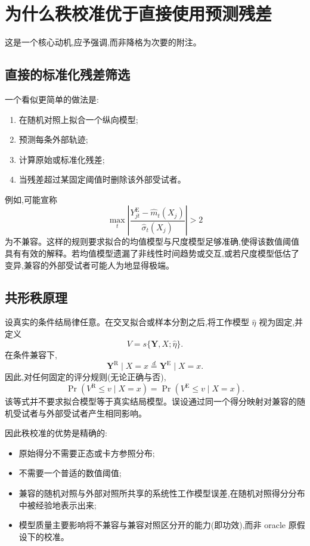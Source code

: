 \documentclass[11pt]{article}
\newcommand{\R}{\mathrm{R}}
\newcommand{\E}{\mathrm{E}}
\begin{document}
\section{为什么秩校准优于直接使用预测残差}

这是一个核心动机,应予强调,而非降格为次要的附注。

\subsection{直接的标准化残差筛选}

一个看似更简单的做法是:
\begin{enumerate}
    \item 在随机对照上拟合一个纵向模型;
    \item 预测每条外部轨迹;
    \item 计算原始或标准化残差;
    \item 当残差超过某固定阈值时删除该外部受试者。
\end{enumerate}

例如,可能宣称
\[
\max_t\left|
\frac{Y_{jt}^{\E}-\widehat m_t(X_j)}{\widehat\sigma_t(X_j)}
\right|>2
\]
为不兼容。这样的规则要求拟合的均值模型与尺度模型足够准确,使得该数值阈值具有有效的解释。若均值模型遗漏了非线性时间趋势或交互,或若尺度模型低估了变异,兼容的外部受试者可能人为地显得极端。

\subsection{共形秩原理}

设真实的条件结局律任意。在交叉拟合或样本分割之后,将工作模型 $\widehat\eta$ 视为固定,并定义
\[
V=s\{\bm Y,X;\widehat\eta\}.
\]
在条件兼容下,
\[
\bm Y^{\R}\mid X=x
\overset d=
\bm Y^{\E}\mid X=x.
\]
因此,对任何固定的评分规则(无论正确与否),
\[
\Pr(V^{\R}\le v\mid X=x)
=
\Pr(V^{\E}\le v\mid X=x).
\tag{2}
\]
该等式并不要求拟合模型等于真实结局模型。误设通过同一个得分映射对兼容的随机受试者与外部受试者产生相同影响。

因此秩校准的优势是精确的:
\begin{itemize}
    \item 原始得分不需要正态或卡方参照分布;
    \item 不需要一个普适的数值阈值;
    \item 兼容的随机对照与外部对照所共享的系统性工作模型误差,在随机对照得分分布中被经验地表示出来;
    \item 模型质量主要影响将不兼容与兼容对照区分开的能力(即功效),而非 oracle 原假设下的校准。
\end{itemize}
\end{document}
